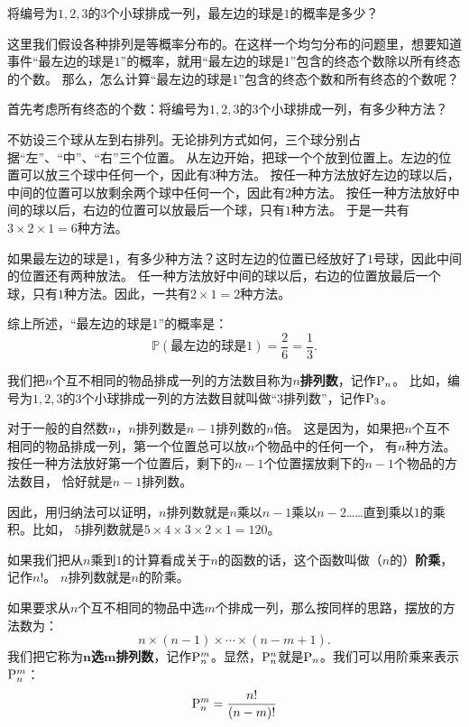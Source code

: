 \documentclass[12pt,UTF8,fontset=none]{ctexbook}
\begin{document}
\begin{ex}
    将编号为$1,2,3$的$3$个小球排成一列，最左边的球是$1$的概率是多少？
\end{ex}
这里我们假设各种排列是等概率分布的。在这样一个均匀分布的问题里，想要知道事件“最左边的球是$1$”的概率，就用“最左边的球是$1$”包含的终态个数除以所有终态的个数。
那么，怎么计算“最左边的球是$1$”包含的终态个数和所有终态的个数呢？

首先考虑所有终态的个数：将编号为$1,2,3$的$3$个小球排成一列，有多少种方法？

不妨设三个球从左到右排列。无论排列方式如何，三个球分别占据“左”、“中”、“右”三个位置。
从左边开始，把球一个个放到位置上。左边的位置可以放三个球中任何一个，因此有$3$种方法。
按任一种方法放好左边的球以后，中间的位置可以放剩余两个球中任何一个，因此有$2$种方法。
按任一种方法放好中间的球以后，右边的位置可以放最后一个球，只有$1$种方法。
于是一共有$3\times 2\times 1 = 6$种方法。

如果最左边的球是$1$，有多少种方法？这时左边的位置已经放好了$1$号球，因此中间的位置还有两种放法。
任一种方法放好中间的球以后，右边的位置放最后一个球，只有$1$种方法。因此，一共有$2\times 1 = 2$种方法。

综上所述，“最左边的球是$1$”的概率是：
$$ \mathbb{P}(\mbox{最左边的球是}1) = \frac{2}{6} = \frac{1}{3}. $$

我们把$n$个互不相同的物品排成一列的方法数目称为$n$\textbf{排列数}，记作$\pilo{n}$。
比如，编号为$1,2,3$的$3$个小球排成一列的方法数目就叫做“$3$排列数”，记作$\pilo{3}$。

对于一般的自然数$n$，$n$排列数是$n-1$排列数的$n$倍。
这是因为，如果把$n$个互不相同的物品排成一列，第一个位置总可以放$n$个物品中的任何一个，
有$n$种方法。按任一种方法放好第一个位置后，剩下的$n-1$个位置摆放剩下的$n-1$个物品的方法数目，
恰好就是$n-1$排列数。

因此，用归纳法可以证明，$n$排列数就是$n$乘以$n-1$乘以$n-2$……直到乘以$1$的乘积。比如，
$5$排列数就是$5\times 4\times 3\times 2\times 1 = 120$。

如果我们把从$n$乘到$1$的计算看成关于$n$的函数的话，这个函数叫做（$n$的）\textbf{阶乘}，记作$n!$。
$n$排列数就是$n$的阶乘。

如果要求从$n$个互不相同的物品中选$m$个排成一列，那么按同样的思路，摆放的方法数为：
$$ n \times (n - 1) \times \cdots \times (n - m + 1).$$
我们把它称为$\boldsymbol{n}$\textbf{选}$\boldsymbol{m}$\textbf{排列数}，记作$\pilo{n}[m]$。显然，$\pilo{n}[n]$就是$\pilo{n}$。我们可以用阶乘来表示$\pilo{n}[m]$：
$$\pilo{n}[m] = \frac{n!}{(n - m)!}$$
\end{document}
